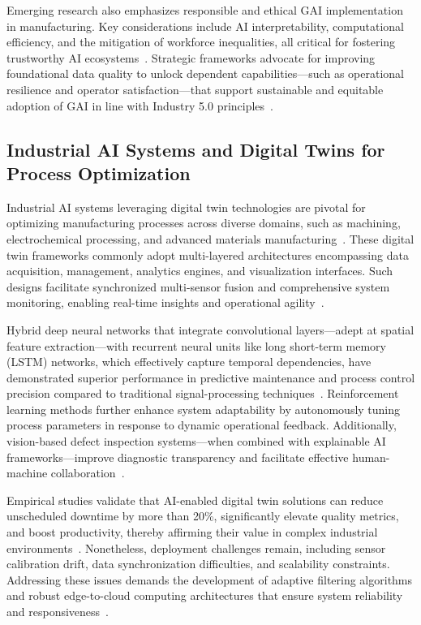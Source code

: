 \documentclass[sigconf]{acmart}
\begin{document}
Emerging research also emphasizes responsible and ethical GAI implementation in manufacturing. Key considerations include AI interpretability, computational efficiency, and the mitigation of workforce inequalities, all critical for fostering trustworthy AI ecosystems~\cite{ref43}. Strategic frameworks advocate for improving foundational data quality to unlock dependent capabilities—such as operational resilience and operator satisfaction—that support sustainable and equitable adoption of GAI in line with Industry 5.0 principles~\cite{ref1}.

\subsection{Industrial AI Systems and Digital Twins for Process Optimization}

Industrial AI systems leveraging digital twin technologies are pivotal for optimizing manufacturing processes across diverse domains, such as machining, electrochemical processing, and advanced materials manufacturing~\cite{ref6,ref33}. These digital twin frameworks commonly adopt multi-layered architectures encompassing data acquisition, management, analytics engines, and visualization interfaces. Such designs facilitate synchronized multi-sensor fusion and comprehensive system monitoring, enabling real-time insights and operational agility~\cite{ref35,ref45}.  

Hybrid deep neural networks that integrate convolutional layers—adept at spatial feature extraction—with recurrent neural units like long short-term memory (LSTM) networks, which effectively capture temporal dependencies, have demonstrated superior performance in predictive maintenance and process control precision compared to traditional signal-processing techniques~\cite{ref4,ref15,ref38}. Reinforcement learning methods further enhance system adaptability by autonomously tuning process parameters in response to dynamic operational feedback. Additionally, vision-based defect inspection systems—when combined with explainable AI frameworks—improve diagnostic transparency and facilitate effective human-machine collaboration~\cite{ref39}.  

Empirical studies validate that AI-enabled digital twin solutions can reduce unscheduled downtime by more than 20\%, significantly elevate quality metrics, and boost productivity, thereby affirming their value in complex industrial environments~\cite{ref31,ref36}. Nonetheless, deployment challenges remain, including sensor calibration drift, data synchronization difficulties, and scalability constraints. Addressing these issues demands the development of adaptive filtering algorithms and robust edge-to-cloud computing architectures that ensure system reliability and responsiveness~\cite{ref34}.
\end{document}
